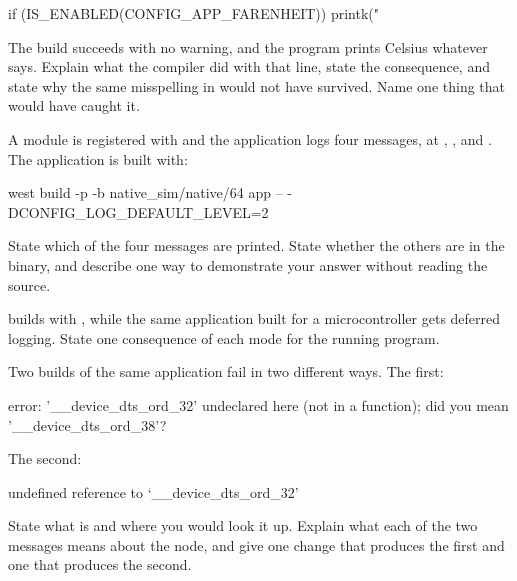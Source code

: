 \begin{ccode}
if (IS_ENABLED(CONFIG_APP_FARENHEIT)) {
	printk("%
}
\end{ccode}

\noindent The build succeeds with no warning, and the program prints Celsius whatever
 says. Explain what the compiler did with that line, state the consequence, and state
why the same misspelling in  would not have survived. Name one thing that would have
caught it. 

 A module is registered with  and the application logs
four messages, at , ,  and . The application
is built with:

\begin{shell}
west build -p -b native_sim/native/64 app -- -DCONFIG_LOG_DEFAULT_LEVEL=2
\end{shell}

\noindent State which of the four messages are printed. State whether the others are in the binary,
and describe one way to demonstrate your answer without reading the source. 

  builds with , while the same
application built for a microcontroller gets deferred logging. State one consequence of each mode
for the running program. 

\label{exa:q:3}

 Two builds of the same application fail in two different ways. The first:

\begin{console}
error: '__device_dts_ord_32' undeclared here (not in a function); did you mean '__device_dts_ord_38'?
\end{console}

\noindent The second:

\begin{console}
undefined reference to `__device_dts_ord_32'
\end{console}

\noindent State what  is and where you would look it up. Explain what each of the two
messages means about the node, and give one change that produces the first and one that produces the
second. 

